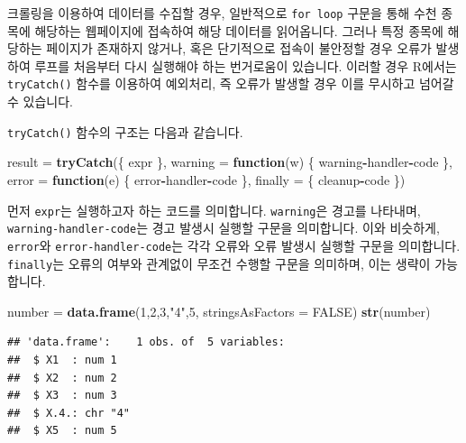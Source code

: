\documentclass[]{book}
\newenvironment{Shaded}{\begin{snugshade}}{\end{snugshade}}
\newcommand{\ControlFlowTok}[1]{\textcolor[rgb]{0.13,0.29,0.53}{\textbf{#1}}}
\newcommand{\DataTypeTok}[1]{\textcolor[rgb]{0.13,0.29,0.53}{#1}}
\newcommand{\DecValTok}[1]{\textcolor[rgb]{0.00,0.00,0.81}{#1}}
\newcommand{\KeywordTok}[1]{\textcolor[rgb]{0.13,0.29,0.53}{\textbf{#1}}}
\newcommand{\NormalTok}[1]{#1}
\newcommand{\OperatorTok}[1]{\textcolor[rgb]{0.81,0.36,0.00}{\textbf{#1}}}
\newcommand{\OtherTok}[1]{\textcolor[rgb]{0.56,0.35,0.01}{#1}}
\newcommand{\StringTok}[1]{\textcolor[rgb]{0.31,0.60,0.02}{#1}}
\begin{document}
크롤링을 이용하여 데이터를 수집할 경우, 일반적으로 \texttt{for\ loop} 구문을 통해 수천 종목에 해당하는 웹페이지에 접속하여 해당 데이터를 읽어옵니다. 그러나 특정 종목에 해당하는 페이지가 존재하지 않거나, 혹은 단기적으로 접속이 불안정할 경우 오류가 발생하여 루프를 처음부터 다시 실행해야 하는 번거로움이 있습니다. 이러할 경우 R에서는 \texttt{tryCatch()} 함수를 이용하여 예외처리, 즉 오류가 발생할 경우 이를 무시하고 넘어갈 수 있습니다.

\texttt{tryCatch()} 함수의 구조는 다음과 같습니다.

\begin{Shaded}
\begin{Highlighting}[]
\NormalTok{result =}\StringTok{ }\KeywordTok{tryCatch}\NormalTok{(\{}
\NormalTok{  expr}
\NormalTok{\}, }\DataTypeTok{warning =} \ControlFlowTok{function}\NormalTok{(w) \{}
\NormalTok{  warning}\OperatorTok{-}\NormalTok{handler}\OperatorTok{-}\NormalTok{code}
\NormalTok{\}, }\DataTypeTok{error =} \ControlFlowTok{function}\NormalTok{(e) \{}
\NormalTok{  error}\OperatorTok{-}\NormalTok{handler}\OperatorTok{-}\NormalTok{code}
\NormalTok{\}, }\DataTypeTok{finally =}\NormalTok{ \{}
\NormalTok{  cleanup}\OperatorTok{-}\NormalTok{code}
\NormalTok{\})}
\end{Highlighting}
\end{Shaded}

먼저 \texttt{expr}는 실행하고자 하는 코드를 의미합니다. \texttt{warning}은 경고를 나타내며, \texttt{warning-handler-code}는 경고 발생시 실행할 구문을 의미합니다. 이와 비슷하게, \texttt{error}와 \texttt{error-handler-code}는 각각 오류와 오류 발생시 실행할 구문을 의미합니다. \texttt{finally}는 오류의 여부와 관계없이 무조건 수행할 구문을 의미하며, 이는 생략이 가능합니다.

\begin{Shaded}
\begin{Highlighting}[]
\NormalTok{number =}\StringTok{ }\KeywordTok{data.frame}\NormalTok{(}\DecValTok{1}\NormalTok{,}\DecValTok{2}\NormalTok{,}\DecValTok{3}\NormalTok{,}\StringTok{"4"}\NormalTok{,}\DecValTok{5}\NormalTok{, }\DataTypeTok{stringsAsFactors =} \OtherTok{FALSE}\NormalTok{)}
\KeywordTok{str}\NormalTok{(number)}
\end{Highlighting}
\end{Shaded}

\begin{verbatim}
## 'data.frame':    1 obs. of  5 variables:
##  $ X1  : num 1
##  $ X2  : num 2
##  $ X3  : num 3
##  $ X.4.: chr "4"
##  $ X5  : num 5
\end{verbatim}
\end{document}
